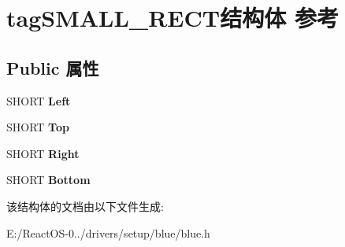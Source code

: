 \hypertarget{structtag_s_m_a_l_l___r_e_c_t}{}\section{tag\+S\+M\+A\+L\+L\+\_\+\+R\+E\+C\+T结构体 参考}
\label{structtag_s_m_a_l_l___r_e_c_t}
\subsection*{Public 属性}
\begin{DoxyCompactItemize}
\item 
\mbox{\label{structtag_s_m_a_l_l___r_e_c_t_a57313f57eb89077c06d743761f6fa9bb}} 
S\+H\+O\+RT {\bfseries Left}
\item 
\mbox{\label{structtag_s_m_a_l_l___r_e_c_t_a6597109ae18ed20cb1e679c64e76ef19}} 
S\+H\+O\+RT {\bfseries Top}
\item 
\mbox{\label{structtag_s_m_a_l_l___r_e_c_t_a2e27f9398939ce28b708774a0aa14ec2}} 
S\+H\+O\+RT {\bfseries Right}
\item 
\mbox{\label{structtag_s_m_a_l_l___r_e_c_t_a6828ddf7f8626ae2449bc568fce83e50}} 
S\+H\+O\+RT {\bfseries Bottom}
\end{DoxyCompactItemize}


该结构体的文档由以下文件生成\+:\begin{DoxyCompactItemize}
\item 
E\+:/\+React\+O\+S-\/0../drivers/setup/blue/blue.\+h\end{DoxyCompactItemize}
